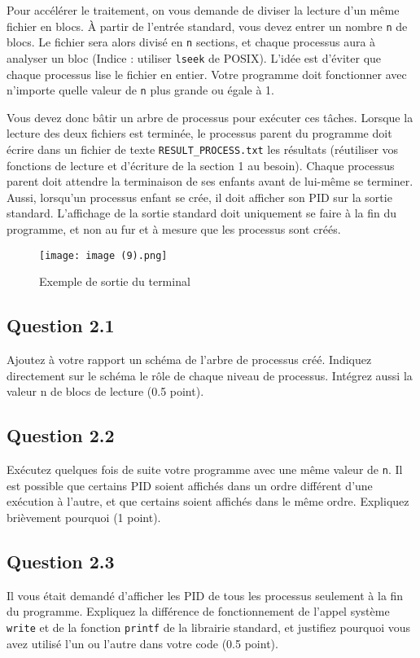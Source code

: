 \documentclass[12pt,addpoints]{exam} %
\begin{document}
Pour accélérer le traitement, on vous demande de diviser la lecture d’un même fichier en blocs. À partir de l’entrée standard, vous devez entrer un nombre \texttt{n} de blocs. Le fichier sera alors divisé en \texttt{n} sections, et chaque processus aura à analyser un bloc (Indice : utiliser \texttt{lseek} de POSIX). L’idée est d’éviter que chaque processus lise le fichier en entier. Votre programme doit fonctionner avec n’importe quelle valeur de \texttt{n} plus grande ou égale à 1.


Vous devez donc bâtir un arbre de processus pour exécuter ces tâches. Lorsque la lecture des deux fichiers est terminée, le processus parent du programme doit écrire dans un fichier de texte \texttt{RESULT\_PROCESS.txt} les résultats (réutiliser vos fonctions de lecture et d’écriture de la section 1 au besoin). Chaque processus parent doit attendre la terminaison de ses enfants avant de lui-même se terminer. Aussi, lorsqu’un processus enfant se crée, il doit afficher son PID sur la sortie standard. L’affichage de la sortie standard doit uniquement se faire à la fin du programme, et non au fur et à mesure que les processus sont créés.


\begin{figure}[H]
    \centering
    \texttt{[image: image (9).png]}
    \caption{Exemple de sortie du terminal}
    \label{fig:placeholder}
\end{figure}



\subsection*{Question 2.1}
Ajoutez à votre rapport un schéma de l’arbre de processus créé. Indiquez directement sur le schéma le rôle de chaque niveau de processus. Intégrez aussi la valeur n de blocs de lecture (0.5 point).

\subsection*{Question 2.2}
Exécutez quelques fois de suite votre programme avec une même valeur de \texttt{n}. Il est possible que certains PID soient affichés dans un ordre différent d’une exécution à l’autre, et que certains soient affichés dans le même ordre. Expliquez brièvement pourquoi (1 point).


\subsection*{Question 2.3}
Il vous était demandé d’afficher les PID de tous les processus seulement à la fin du programme. Expliquez la différence de fonctionnement de l’appel système \texttt{write} et de la fonction \texttt{printf} de la librairie standard, et justifiez pourquoi vous avez utilisé l’un ou l’autre dans votre code (0.5 point).
\end{document}
